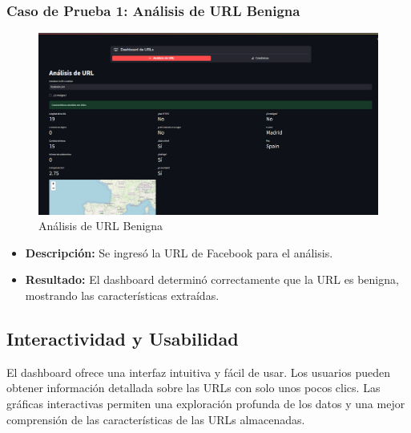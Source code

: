 \subsubsection*{Caso de Prueba 1: Análisis de URL Benigna}


\begin{figure}[H]
    \centering
    \includegraphics[width=\textwidth]{analisisUrlBenignaDashboard}
    \caption{Análisis de URL Benigna}
\end{figure}

\begin{itemize}
    \item \textbf{Descripción:} Se ingresó la URL de Facebook para el análisis.
    \item \textbf{Resultado:} El dashboard determinó correctamente que la URL es benigna, mostrando las características extraídas.
\end{itemize}



\subsection*{Interactividad y Usabilidad}

El dashboard ofrece una interfaz intuitiva y fácil de usar. Los usuarios pueden obtener información detallada sobre las URLs con solo unos pocos clics. Las gráficas interactivas permiten una exploración profunda de los datos y una mejor comprensión de las características de las URLs almacenadas.


